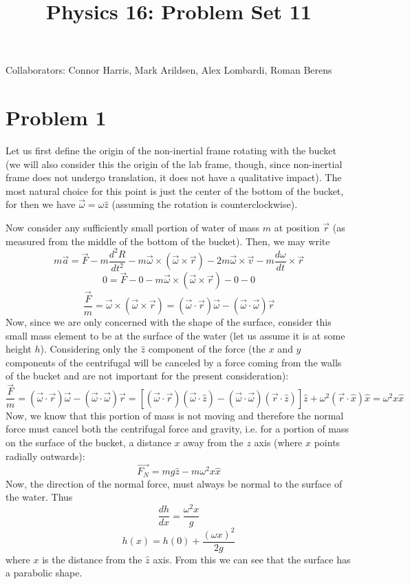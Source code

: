 \title{Physics 16: Problem Set 11}

\maketitle
\begin{center}
Collaborators: Connor Harris, Mark Arildsen, Alex Lombardi, Roman Berens
\end{center}
\section*{Problem 1}
Let us first define the origin of the non-inertial frame rotating with the bucket (we will also consider this the origin of the lab frame, though, since non-inertial frame does not undergo translation, it does not have a qualitative impact). The most natural choice for this point is just the center of the bottom of the bucket, for then we have $\vec{\omega} = \omega\hat{z}$ (assuming the rotation is counterclockwise). \par Now consider any sufficiently small portion of water of mass $m$ at position $\vec{r}$ (as measured from the middle of the bottom of the bucket). Then, we may write
\[ m\vec{a} = \vec{F} - m\frac{d^2R}{dt^2} - m\vec{\omega}\times(\vec{\omega}\times\vec{r}) - 2m\vec{\omega}\times \vec{v}-m\frac{d\omega}{dt}\times \vec{r} \]
\[ 0 = \vec{F} -  0 - m\vec{\omega}\times(\vec{\omega}\times\vec{r})  - 0 - 0\]
\[ \frac{\vec{F}}{m} = \vec{\omega}\times(\vec{\omega}\times\vec{r}) = (\vec{\omega} \cdot \vec{r}) \vec{\omega}  - (\vec{\omega}\cdot\vec{\omega})\vec{r} \]
Now, since we are only concerned with the shape of the surface, consider this small mass element to be at the surface of the water (let us assume it is at some height $h$). Considering only the $\hat{z}$ component of the force (the $x$ and $y$ components of the centrifugal will be canceled by a force coming from the walls of the bucket and are not important for the present consideration):
\[  \frac{\vec{F}}{m} = (\vec{\omega}\cdot\vec{r})\vec{\omega}-(\vec{\omega}\cdot\vec{\omega})\vec{r} = 
\left[(\vec{\omega}\cdot\vec{r})(\vec{\omega}\cdot \hat{z})-(\vec{\omega}\cdot\vec{\omega})(\vec{r}\cdot\hat{z})\right]\hat{z} + \omega^2(\vec{r}\cdot \hat{x}) \hat{x} = \omega^2 x \hat{x} \]
Now, we know that this portion of mass is not moving and therefore the normal force must cancel both the centrifugal force and gravity, i.e. for a portion of mass on the surface of the bucket, a distance $x$ away from the $z$ axis (where $\hat{x}$ points radially outwards):
\[ \vec{F_N} = mg\hat{z} - m \omega^2 x \hat{x} \]
Now, the direction of the normal force, must always be normal to the surface of the water. Thus 
\[ \frac{dh}{dx} = \frac{\omega^2x}{g} \]
\[ h(x) = h(0) + \frac{(\omega x)^2}{2g} \]
where $x$ is the distance from the $\hat{z}$ axis. From this we can see that the surface has a parabolic shape.

